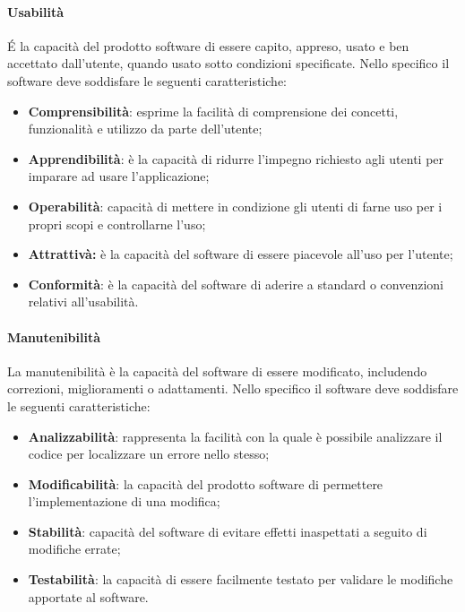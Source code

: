 \paragraph{Usabilità}
\'E la capacità del prodotto software di essere capito, appreso, usato e ben accettato dall'utente, quando usato sotto condizioni specificate.
Nello specifico il software deve soddisfare le seguenti caratteristiche:
\begin{itemize}
	\item \textbf{Comprensibilità}: esprime la facilità di comprensione dei concetti, funzionalità e utilizzo da parte dell'utente;
	\item \textbf{Apprendibilità}: è la capacità di ridurre l'impegno richiesto agli utenti per imparare ad usare l'applicazione;
	\item \textbf{Operabilità}: capacità di mettere in condizione gli utenti di farne uso per i propri scopi e controllarne l'uso;
	\item \textbf{Attrattivà:} è la capacità del software di essere piacevole all'uso per l'utente;
	\item \textbf{Conformità}: è la capacità del software di aderire a standard o convenzioni relativi all'usabilità.

\end{itemize}
\paragraph{Manutenibilità}
La manutenibilità è la capacità del software di essere modificato, includendo correzioni, miglioramenti o adattamenti.
Nello specifico il software deve soddisfare le seguenti caratteristiche:
\begin{itemize}
	\item \textbf{Analizzabilità}: rappresenta la facilità con la quale è possibile analizzare il codice per localizzare un errore nello stesso;
	\item \textbf{Modificabilità}: la capacità del prodotto software di permettere l'implementazione di una modifica;
	\item \textbf{Stabilità}: capacità del software di evitare effetti inaspettati a seguito di modifiche errate;
	\item \textbf{Testabilità}: la capacità di essere facilmente testato per validare le modifiche apportate al software.
\end{itemize}
